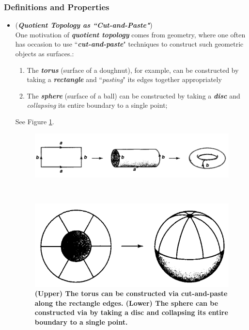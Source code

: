 \documentclass[11pt]{article}
\begin{document}
\subsubsection{Definitions and Properties}
\begin{itemize}
\item \begin{remark} (\emph{\textbf{Quotient Topology as ``Cut-and-Paste"}})\\
One motivation of \emph{\textbf{quotient topology}} comes from geometry, where one often has occasion to use ``\emph{\textbf{cut-and-paste}}" techniques to construct such geometric objects as surfaces.:
\begin{enumerate}
\item The \emph{\textbf{torus}} (surface of a doughnut), for example, can be constructed by taking a \emph{\textbf{rectangle}} and ``\emph{pasting}" its edges together appropriately
\item The \emph{\textbf{sphere}} (surface of a ball) can be constructed by taking a \emph{\textbf{disc}} and \emph{collapsing} its entire boundary to a single point;  
\end{enumerate}
See Figure \ref{fig: quotient_topology}.
\end{remark}


\begin{figure}
\begin{minipage}[t]{1\linewidth}
  \centering
  \centerline{\includegraphics[scale = 0.4]{torus_quotient.png}}
\end{minipage}\\
\begin{minipage}[t]{1\linewidth}
  \centering
  \centerline{\includegraphics[scale = 0.4]{sphere_quotient.png}}
\end{minipage}
\caption{\footnotesize{\textbf{(Upper) The torus can be constructed via cut-and-paste along the rectangle edges. (Lower) The sphere can be constructed via by taking a disc and collapsing its entire boundary to a single point. \citep{munkres2000topology}}}}
\label{fig: quotient_topology}
\end{figure}



\end{itemize}
\end{document}
